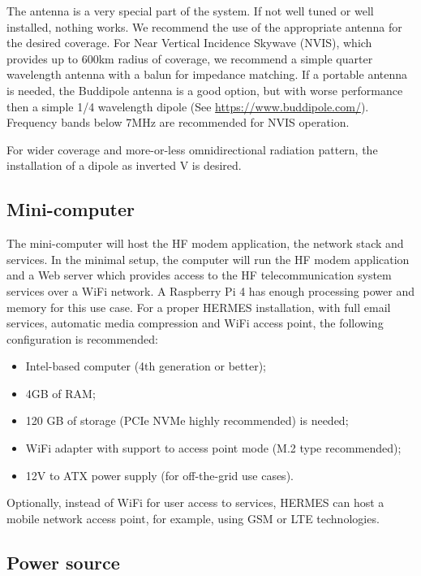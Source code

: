 The antenna is a very special part of the system. If not well tuned or well
installed, nothing works. We recommend the use of the appropriate antenna
for the desired coverage. For Near Vertical Incidence Skywave (NVIS), which
provides up to 600km radius of coverage, we recommend a simple quarter wavelength
antenna with a balun for impedance matching. If a portable antenna is
needed, the Buddipole antenna is a good option, but with worse performance
then a simple 1/4 wavelength dipole (See
\url{https://www.buddipole.com/}). Frequency bands below 7MHz are
recommended for NVIS operation.

For wider coverage and more-or-less omnidirectional radiation pattern, the
installation of a dipole as inverted V is desired.

\subsection{Mini-computer}

The mini-computer will host the HF modem application, the network
stack and services. In the minimal setup, the computer will run the HF
modem application and a Web server which provides access to the HF
telecommunication system services over a WiFi network. A Raspberry Pi 4 has
enough processing power and memory for this use case. For a proper HERMES
installation, with full email services, automatic media compression and WiFi
access point, the following configuration is recommended:

\begin{itemize}
\item Intel-based computer (4th generation or better);
\item 4GB of RAM;
\item 120 GB of storage (PCIe NVMe highly recommended) is needed;
\item WiFi adapter with support to access point mode (M.2 type recommended);
\item 12V to ATX power supply (for off-the-grid use cases).
\end{itemize}

Optionally, instead of WiFi for user access to services, HERMES can host
a mobile network access point, for example, using GSM or LTE technologies.

\subsection{Power source}

